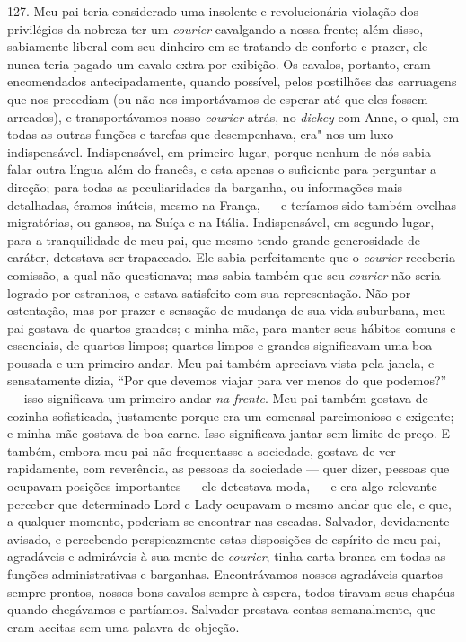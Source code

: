 127. Meu pai teria considerado uma insolente e revolucionária violação
dos privilégios da nobreza ter um \emph{courier} cavalgando a nossa
frente; além disso, sabiamente liberal com seu dinheiro em se tratando
de conforto e prazer, ele nunca teria pagado um cavalo extra por
exibição. Os cavalos, portanto, eram encomendados antecipadamente,
quando possível, pelos postilhões das carruagens que nos precediam (ou
não nos importávamos de esperar até que eles fossem arreados), e
transportávamos nosso \emph{courier} atrás, no \emph{dickey} com Anne, o
qual, em todas as outras funções e tarefas que desempenhava, era"-nos um
luxo indispensável. Indispensável, em primeiro lugar, porque nenhum de
nós sabia falar outra língua além do francês, e esta apenas o suficiente
para perguntar a direção; para todas as peculiaridades da barganha, ou
informações mais detalhadas, éramos inúteis, mesmo na França, --- e
teríamos sido também ovelhas migratórias, ou gansos, na Suíça e na
Itália. Indispensável, em segundo lugar, para a tranquilidade de meu
pai, que mesmo tendo grande generosidade de caráter, detestava ser
trapaceado. Ele sabia perfeitamente que o \emph{courier} receberia
comissão, a qual não questionava; mas sabia também que seu
\emph{courier} não seria logrado por estranhos, e estava satisfeito com
sua representação. Não por ostentação, mas por prazer e sensação de
mudança de sua vida suburbana, meu pai gostava de quartos grandes; e
minha mãe, para manter seus hábitos comuns e essenciais, de quartos
limpos; quartos limpos e grandes significavam uma boa pousada e um
primeiro andar. Meu pai também apreciava vista pela janela, e
sensatamente dizia, ``Por que devemos viajar para ver menos do que
podemos?'' --- isso significava um primeiro andar \emph{na frente}. Meu
pai também gostava de cozinha sofisticada, justamente porque era um
comensal parcimonioso e exigente; e minha mãe gostava de boa carne. Isso
significava jantar sem limite de preço. E também, embora meu pai não
frequentasse a sociedade, gostava de ver rapidamente, com reverência, as
pessoas da sociedade --- quer dizer, pessoas que ocupavam posições
importantes --- ele detestava moda, --- e era algo relevante perceber que
determinado Lord e Lady ocupavam o mesmo andar que ele, e que, a
qualquer momento, poderiam se encontrar nas escadas. Salvador,
devidamente avisado, e percebendo perspicazmente estas disposições de
espírito de meu pai, agradáveis e admiráveis à sua mente de
\emph{courier}, tinha carta branca em todas as funções administrativas e
barganhas. Encontrávamos nossos agradáveis quartos sempre prontos,
nossos bons cavalos sempre à espera, todos tiravam seus chapéus quando
chegávamos e partíamos. Salvador prestava contas semanalmente, que eram
aceitas sem uma palavra de objeção.

